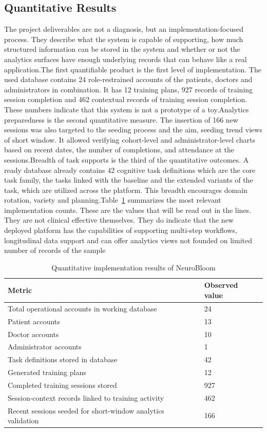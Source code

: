 \documentclass[12pt,a4paper]{report}
\begin{document}
\subsection{Quantitative Results}
The project deliverables are not a diagnosis, but an implementation-focused process. They describe what the system is capable of supporting, how much structured information can be stored in the system and whether or not the analytics surfaces have enough underlying records that can behave like a real application.The first quantifiable product is the first level of implementation. The used database contains 24 role-restrained accounts of the patients, doctors and administrators in combination. It has 12 training plans, 927 records of training session completion and 462 contextual records of training session completion. These numbers indicate that this system is not a prototype of a toy.Analytics preparedness is the second quantitative measure. The insertion of 166 new sessions was also targeted to the seeding process and the aim, seeding trend views of short window. It allowed verifying cohort-level and administrator-level charts based on recent dates, the number of completions, and attendance at the sessions.Breadth of task supports is the third of the quantitative outcomes. A ready database already contains 42 cognitive task definitions which are the core task family, the tasks linked with the baseline and the extended variants of the task, which are utilized across the platform. This breadth encourages domain rotation, variety and planning.Table~\ref{tab:chapter4_quantitative_results} summarizes the most relevant implementation counts.
These are the values that will be read out in the lines. They are not clinical effective themselves. They do indicate that the new deployed platform has the capabilities of supporting multi-step workflows, longitudinal data support and can offer analytics views not founded on limited number of records of the sample
\begin{table}[htbp]
\centering
\caption{Quantitative implementation results of NeuroBloom}
\label{tab:chapter4_quantitative_results}
\begin{tabular}{|p{8cm}|p{3.5cm}|}
\hline
\textbf{Metric} & \textbf{Observed value} \\
\hline
Total operational accounts in working database & 24 \\
\hline
Patient accounts & 13 \\
\hline
Doctor accounts & 10 \\
\hline
Administrator accounts & 1 \\
\hline
Task definitions stored in database & 42 \\
\hline
Generated training plans & 12 \\
\hline
Completed training sessions stored & 927 \\
\hline
Session-context records linked to training activity & 462 \\
\hline
Recent sessions seeded for short-window analytics validation & 166 \\
\hline
\end{tabular}
\end{table}
\end{document}
